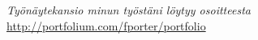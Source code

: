 \documentclass[12pt, oneside]{article}
\newcommand{\headingstyleJobs}[1] {
	{\fontsize{18pt}{1em}\selectfont \textcolor{new_red}{\textsf{#1}}}
	\textcolor{new_red}{\rule{3.25in}{0.5pt}} \vspace{3pt}
}
\newcommand{\jobtitle}[3] {
	{\bf #1} · {#2} · {#3} \vspace{-7pt} \\
}
\begin{document}
\begin{flushleft}






%
%
%


\textit{Työnäytekansio minun työstäni löytyy osoitteesta} \url{http://portfolium.com/fporter/portfolio}

\end{flushleft}
\end{document}
